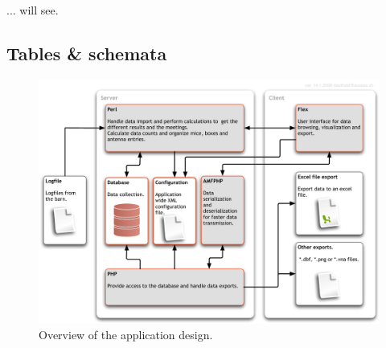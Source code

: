 \documentclass[a4paper,10pt,twoside,headings=small,bibliography=totocnumbered,headsepline]{scrartcl}
\begin{document}
... will see.

\newpage



\begin{appendix}
\addappheadtotoc


\newpage
\section{Tables \& schemata}
\label{sec:tables_schmemata}

\begin{figure}[htpb]
\begin{center}
  \includegraphics[width=\textwidth]{assets/pdf/app_design.pdf}
  \caption[Application design]{Overview of the application design.}
  \label{fig:app_design}
\end{center}
\end{figure}



\end{appendix}
\end{document}
